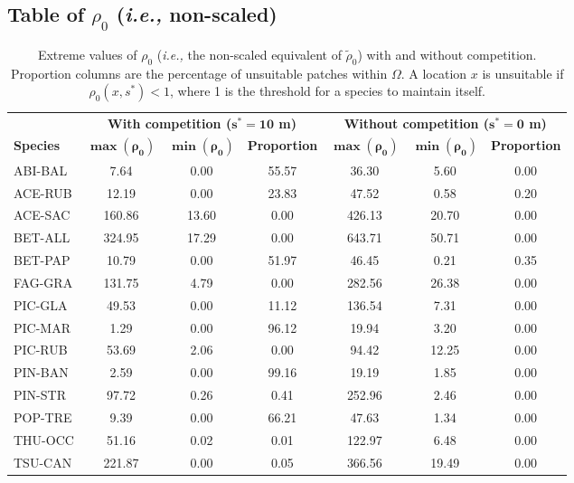 \documentclass[letterpaper, 12pt]{article}
\newcommand {\ie}{\textit{i.e., }}
\newcommand {\s}{{s}^{*}}
\theoremstyle{theo}
\begin{document}
\begin{refsection}
\begin{onehalfspace}
	\subsection{Table of $ \rho_0 $ (\ie non-scaled)}
	\begin{table}[h]
	\centering
	\caption{Extreme values of $ \rho_0 $ (\ie the non-scaled equivalent of $ \tilde \rho_0 $) with and without competition. Proportion columns are the percentage of unsuitable patches within $ \Omega $. A location $ x $ is unsuitable if $ \rho_0(x, \s) < 1 $, where 1 is the threshold for a species to maintain itself. \label{tab::R0_min_max}}
	\begin{tabular}{lcccccc}
		\toprule
			~ & \multicolumn{3}{c}{\textbf{With competition ($ \bm {\s = 10} $ m)}} & \multicolumn{3}{c}{\textbf{Without competition ($ \bm {\s = 0} $ m)}} \\
		\cmidrule(lr){2-4} \cmidrule(lr){5-7}
			\textbf{Species} & $ \bm{\max(\rho_0)} $ & $ \bm{\min(\rho_0)} $ & \textbf{Proportion} & $ \bm{\max(\rho_0)} $ & $ \bm{\min(\rho_0)} $ & \textbf{Proportion} \\
		\midrule
			ABI-BAL & 7.64 & 0.00 & 55.57 & 36.30 & 5.60 & 0.00 \\
			ACE-RUB & 12.19 & 0.00 & 23.83 & 47.52 & 0.58 & 0.20 \\
			ACE-SAC & 160.86 & 13.60 & 0.00 & 426.13 & 20.70 & 0.00 \\
			BET-ALL & 324.95 & 17.29 & 0.00 & 643.71 & 50.71 & 0.00 \\
			BET-PAP & 10.79 & 0.00 & 51.97 & 46.45 & 0.21 & 0.35 \\
			FAG-GRA & 131.75 & 4.79 & 0.00 & 282.56 & 26.38 & 0.00 \\
			PIC-GLA & 49.53 & 0.00 & 11.12 & 136.54 & 7.31 & 0.00 \\
			PIC-MAR & 1.29 & 0.00 & 96.12 & 19.94 & 3.20 & 0.00 \\
			PIC-RUB & 53.69 & 2.06 & 0.00 & 94.42 & 12.25 & 0.00 \\
			PIN-BAN & 2.59 & 0.00 & 99.16 & 19.19 & 1.85 & 0.00 \\
			PIN-STR & 97.72 & 0.26 & 0.41 & 252.96 & 2.46 & 0.00 \\
			POP-TRE & 9.39 & 0.00 & 66.21 & 47.63 & 1.34 & 0.00 \\
			THU-OCC & 51.16 & 0.02 & 0.01 & 122.97 & 6.48 & 0.00 \\
			TSU-CAN & 221.87 & 0.00 & 0.05 & 366.56 & 19.49 & 0.00 \\
		\bottomrule
	\end{tabular}
	\end{table}

\end{onehalfspace}

\clearpage
\printbibliography[heading=subbibliography]
\end{refsection}
\end{document}
